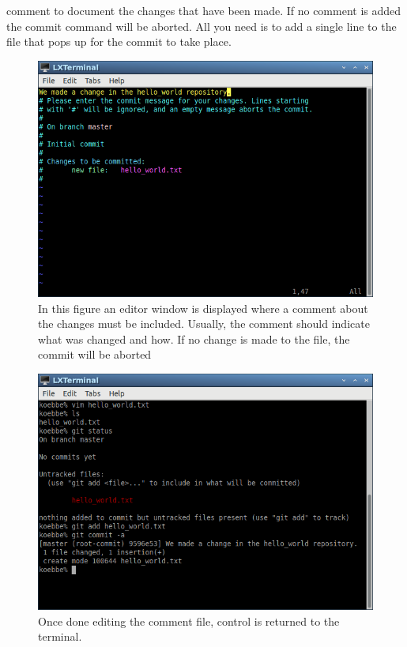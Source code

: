 \documentclass[10pt,fleqn]{article}
\begin{document}
comment to document the changes that have been made. If no comment is added the
commit command will be aborted. All you need is to add a single line to the file
that pops up for the commit to take place.
\vfill
\begin{figure}[h]
\centering
\includegraphics[width=5.0in]{../images/git_08.png}
\caption{In this figure an editor window is displayed where a comment about the
changes must be included. Usually, the comment should indicate what was changed
and how. If no change is made to the file, the commit will be aborted}
\end{figure}
\vfill
\begin{figure}[h]
\centering
\includegraphics[width=5.0in]{../images/git_09.png}
\caption{Once done editing the comment file, control is returned to the
terminal.}
\end{figure}
\eject
\end{document}
